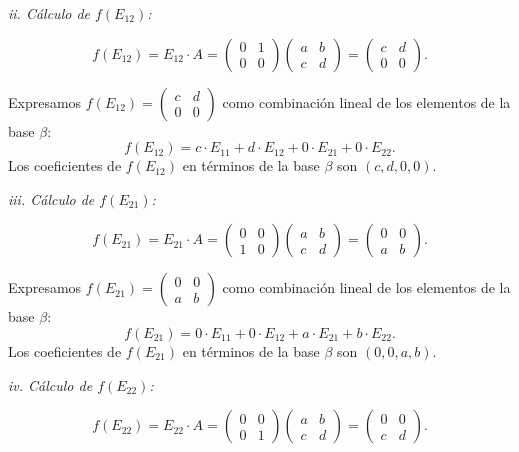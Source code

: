 \documentclass{article}
\begin{document}
\textit{ii. Cálculo de \( f(E_{12}) \):}

   \[
   f(E_{12}) = E_{12} \cdot A = \begin{pmatrix} 0 & 1 \\ 0 & 0 \end{pmatrix} \begin{pmatrix} a & b \\ c & d \end{pmatrix} = \begin{pmatrix} c & d \\ 0 & 0 \end{pmatrix}.
   \]

   Expresamos \( f(E_{12}) = \begin{pmatrix} c & d \\ 0 & 0 \end{pmatrix} \) como combinación lineal de los elementos de la base \( \beta \):
   \[
   f(E_{12}) = c \cdot E_{11} + d \cdot E_{12} + 0 \cdot E_{21} + 0 \cdot E_{22}.
   \]
   Los coeficientes de \( f(E_{12}) \) en términos de la base \( \beta \) son \( (c, d, 0, 0) \).

\textit{iii. Cálculo de \( f(E_{21}) \):}

   \[
   f(E_{21}) = E_{21} \cdot A = \begin{pmatrix} 0 & 0 \\ 1 & 0 \end{pmatrix} \begin{pmatrix} a & b \\ c & d \end{pmatrix} = \begin{pmatrix} 0 & 0 \\ a & b \end{pmatrix}.
   \]

   Expresamos \( f(E_{21}) = \begin{pmatrix} 0 & 0 \\ a & b \end{pmatrix} \) como combinación lineal de los elementos de la base \( \beta \):
   \[
   f(E_{21}) = 0 \cdot E_{11} + 0 \cdot E_{12} + a \cdot E_{21} + b \cdot E_{22}.
   \]
   Los coeficientes de \( f(E_{21}) \) en términos de la base \( \beta \) son \( (0, 0, a, b) \).

\textit{iv. Cálculo de \( f(E_{22}) \):}

   \[
   f(E_{22}) = E_{22} \cdot A = \begin{pmatrix} 0 & 0 \\ 0 & 1 \end{pmatrix} \begin{pmatrix} a & b \\ c & d \end{pmatrix} = \begin{pmatrix} 0 & 0 \\ c & d \end{pmatrix}.
   \]
\end{document}
